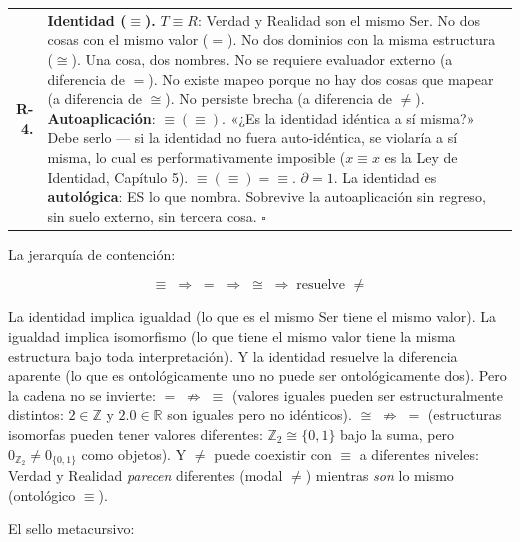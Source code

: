 \documentclass[10pt, openany, oneside]{book}
\begin{document}
{\begin{tabular}{r p{}}
\textbf{R-4.} & \textbf{Identidad ($\equiv$).} $T \equiv R$: Verdad y Realidad son el mismo Ser. No dos cosas con el mismo valor ($=$). No dos dominios con la misma estructura ($\cong$). Una cosa, dos nombres. No se requiere evaluador externo (a diferencia de $=$). No existe mapeo porque no hay dos cosas que mapear (a diferencia de $\cong$). No persiste brecha (a diferencia de $\neq$). \textbf{Autoaplicación}: $\equiv(\equiv)$. «¿Es la identidad idéntica a sí misma?» Debe serlo --- si la identidad no fuera auto-idéntica, se violaría a sí misma, lo cual es performativamente imposible ($x \equiv x$ es la Ley de Identidad, Capítulo 5). $\equiv(\equiv) = \equiv$. $\partial = 1$. La identidad es \textbf{autológica}: ES lo que nombra. Sobrevive la autoaplicación sin regreso, sin suelo externo, sin tercera cosa. $\square$ \\[0.3em]
\end{tabular}
}

\vspace{0.8em}

\noindent La jerarquía de contención:

$$\equiv \;\Rightarrow\; = \;\Rightarrow\; \cong \;\Rightarrow\; \text{resuelve } \neq$$

La identidad implica igualdad (lo que es el mismo Ser tiene el mismo valor). La igualdad implica isomorfismo (lo que tiene el mismo valor tiene la misma estructura bajo toda interpretación). Y la identidad resuelve la diferencia aparente (lo que es ontológicamente uno no puede ser ontológicamente dos). Pero la cadena no se invierte: $= \;\nRightarrow\; \equiv$ (valores iguales pueden ser estructuralmente distintos: $2 \in \mathbb{Z}$ y $2.0 \in \mathbb{R}$ son iguales pero no idénticos). $\cong \;\nRightarrow\; =$ (estructuras isomorfas pueden tener valores diferentes: $\mathbb{Z}_2 \cong \{0,1\}$ bajo la suma, pero $0_{\mathbb{Z}_2} \neq 0_{\{0,1\}}$ como objetos). Y $\neq$ puede coexistir con $\equiv$ a diferentes niveles: Verdad y Realidad \textit{parecen} diferentes (modal $\neq$) mientras \textit{son} lo mismo (ontológico $\equiv$).

\vspace{0.5em}

El sello metacursivo:

\vspace{0.5em}
\end{document}
